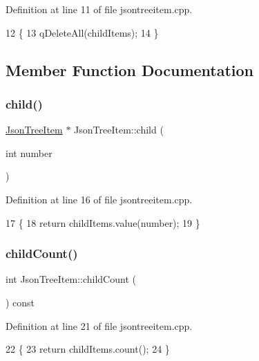 Definition at line 11 of file jsontreeitem.\+cpp.


\begin{DoxyCode}
12 \{
13     qDeleteAll(childItems);
14 \}
\end{DoxyCode}


\subsection{Member Function Documentation}
\mbox{\label{class_json_tree_item_a24864c7936a43d9059277a20497341b9}} 
\subsubsection{\texorpdfstring{child()}{child()}}
{\footnotesize\ttfamily \hyperlink{class_json_tree_item}{Json\+Tree\+Item} $\ast$ Json\+Tree\+Item\+::child (\begin{DoxyParamCaption}\item[{int}]{number }\end{DoxyParamCaption})}



Definition at line 16 of file jsontreeitem.\+cpp.


\begin{DoxyCode}
17 \{
18     \textcolor{keywordflow}{return} childItems.value(number);
19 \}
\end{DoxyCode}
\mbox{\label{class_json_tree_item_a24d3056cd6f6f2d442cbd0d9756b89c1}} 
\subsubsection{\texorpdfstring{child\+Count()}{childCount()}}
{\footnotesize\ttfamily int Json\+Tree\+Item\+::child\+Count (\begin{DoxyParamCaption}{ }\end{DoxyParamCaption}) const}



Definition at line 21 of file jsontreeitem.\+cpp.


\begin{DoxyCode}
22 \{
23     \textcolor{keywordflow}{return} childItems.count();
24 \}
\end{DoxyCode}
\mbox{\label{class_json_tree_item_a39c277f6a181ec177b483b38e97e70d5}} 
